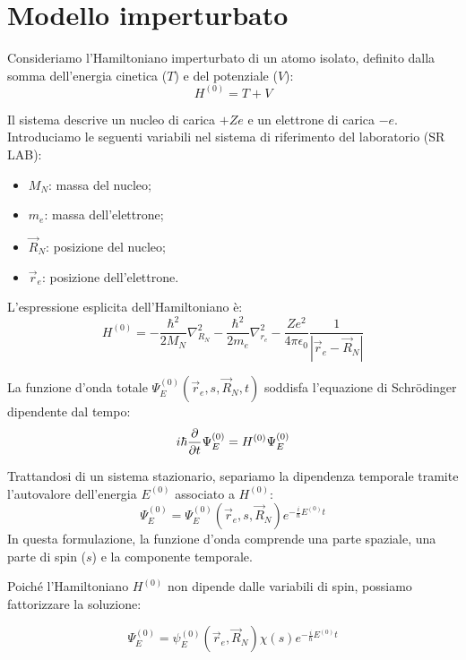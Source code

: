 \section{Modello imperturbato}

Consideriamo l'Hamiltoniano imperturbato di un atomo isolato, definito dalla somma dell'energia cinetica (\(T\)) e del potenziale (\(V\)):
\begin{equation}
    H^{(0)} = T + V
\end{equation}

Il sistema descrive un nucleo di carica \(+Ze\) e un elettrone di carica \(-e\). Introduciamo le seguenti variabili nel sistema di riferimento del laboratorio (SR LAB):
\begin{itemize}
    \item \(M_N\): massa del nucleo;
    \item \(m_e\): massa dell'elettrone;
    \item \(\vec{R}_N\): posizione del nucleo;
    \item \(\vec{r}_e\): posizione dell'elettrone.
\end{itemize}


L'espressione esplicita dell'Hamiltoniano è:
\begin{equation}
    H^{(0)} = -\frac{\hbar^2}{2M_N} \nabla_{R_N}^2 - \frac{\hbar^2}{2m_e} \nabla_{r_e}^2 - \frac{Ze^2}{4\pi\epsilon_0} \frac{1}{|\vec{r}_e - \vec{R}_N|}
\end{equation}

La funzione d'onda totale \(\Psi_E^{(0)}(\vec{r}_e, s, \vec{R}_N, t)\) soddisfa l'equazione di Schrödinger dipendente dal tempo:
\begin{equation}
    i\hbar \pdv{t} \Psi_E^{(0)} = H^{(0)} \Psi_E^{(0)}
\end{equation}

Trattandosi di un sistema stazionario, separiamo la dipendenza temporale tramite l'autovalore dell'energia \(E^{(0)}\) associato a \(H^{(0)}\):
\begin{equation}
    \Psi_E^{(0)} = \Psi_E^{(0)}(\vec{r}_e, s, \vec{R}_N) e^{-\frac{i}{\hbar}E^{(0)}t}
\end{equation}
In questa formulazione, la funzione d'onda comprende una parte spaziale, una parte di spin (\(s\)) e la componente temporale.

Poiché l'Hamiltoniano \(H^{(0)}\) non dipende dalle variabili di spin, possiamo fattorizzare la soluzione:
\begin{tcolorbox}[colback=blue!5, colframe=blue!50, sharp corners, boxrule=0.5pt]
    \begin{equation}
        \Psi_E^{(0)} = \psi_E^{(0)}(\vec{r}_e, \vec{R}_N) \chi(s) e^{-\frac{i}{\hbar}E^{(0)}t}
    \end{equation}
\end{tcolorbox}

